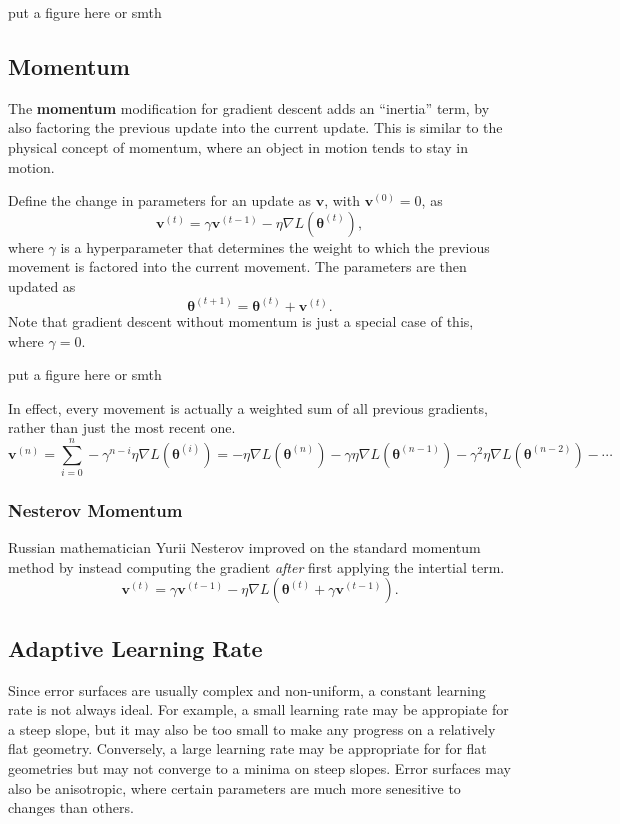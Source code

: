 \documentclass[12pt]{report}
\theoremstyle{definition}
\theoremstyle{remark}
\begin{document}
put a figure here or smth


\subsection{Momentum}
The \textbf{momentum} modification for gradient descent adds an ``inertia'' term, by also factoring the previous update into the current update. This is similar to the physical concept of momentum, where an object in motion tends to stay in motion.

Define the change in parameters for an update as $\mathbf{v}$, with $\mathbf{v}^{(0)} = 0$, as
\begin{equation}
    \mathbf{v}^{(t)} = \gamma \mathbf{v}^{(t-1)} - \eta \nabla L(\boldsymbol{\theta}^{(t)}),
\end{equation}
where $\gamma$ is a hyperparameter that determines the weight to which the previous movement is factored into the current movement. The parameters are then updated as
\begin{equation}
    \boldsymbol{\theta}^{(t+1)} = \boldsymbol{\theta}^{(t)} + \mathbf{v}^{(t)}.
\end{equation}
Note that gradient descent without momentum is just a special case of this, where $\gamma = 0$.

put a figure here or smth

In effect, every movement is actually a weighted sum of all previous gradients, rather than just the most recent one.
\begin{equation}
    \mathbf{v}^{(n)} = \sum_{i=0}^{n} -\gamma^{n-i} \eta\nabla L(\boldsymbol{\theta}^{(i)}) = -\eta\nabla L(\boldsymbol{\theta}^{(n)}) - \gamma \eta\nabla L(\boldsymbol{\theta}^{(n-1)}) - \gamma^2 \eta\nabla L(\boldsymbol{\theta}^{(n-2)}) - \cdots
\end{equation}

\subsubsection{Nesterov Momentum}
Russian mathematician Yurii Nesterov improved on the standard momentum method by instead computing the gradient \textit{after} first applying the intertial term.
\begin{equation}
    \mathbf{v}^{(t)} = \gamma \mathbf{v}^{(t-1)} - \eta \nabla L(\boldsymbol{\theta}^{(t)} + \gamma \mathbf{v}^{(t-1)}).
\end{equation}

\subsection{Adaptive Learning Rate}
Since error surfaces are usually complex and non-uniform, a constant learning rate is not always ideal. For example, a small learning rate may be appropiate for a steep slope, but it may also be too small to make any progress on a relatively flat geometry. Conversely, a large learning rate may be appropriate for for flat geometries but may not converge to a minima on steep slopes. Error surfaces may also be anisotropic, where certain parameters are much more senesitive to changes than others.
\end{document}
